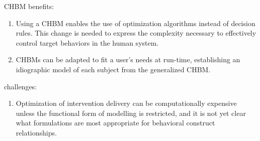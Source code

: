\documentclass[runningheads,a4paper]{llncs}
\begin{document}
CHBM benefits:
\begin{enumerate}
    \item Using a CHBM enables the use of optimization algorithms instead of decision rules. This change is needed to express the complexity necessary to effectively control target behaviors in the human system.
    \item CHBMs can be adapted to fit a user's needs at run-time, establishing an idiographic model of each subject from the generalized CHBM.
\end{enumerate}

challenges:
\begin{enumerate}
    \item Optimization of intervention delivery can be computationally expensive unless the functional form of modelling is restricted, and it is not yet clear what formulations are most appropriate for behavioral construct relationships.
\end{enumerate}
\end{document}
